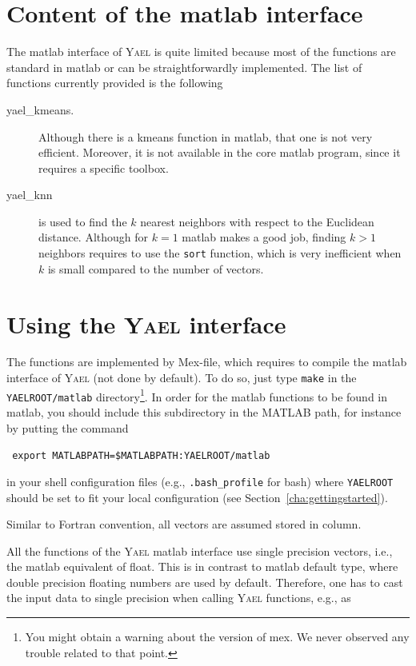 \documentclass[a4paper,11pt,notitlepage,final,twoside]{report}
\newcommand{\yael}{\textsc{Yael}\xspace}
\newcommand{\yroot}{\texttt{YAELROOT}\xspace}
\newcommand{\tc}[1]{\texttt{#1}}
\newcommand{\code}[1]{\smallskip 

\texttt{#1} 
 \medskip

}
\begin{document}
\section{Content of the matlab interface}

The matlab interface of \yael is quite limited because most 
of the functions are standard in matlab or can be straightforwardly 
implemented. 
The list of functions currently provided is the following
\begin{description}
\item  [yael\_kmeans.] Although there is a kmeans function in matlab, 
that one is not very efficient. Moreover, it is not available in 
the core matlab program, since it requires a specific toolbox. 
\item [yael\_knn] is used to find the $k$ nearest neighbors with respect 
to the Euclidean distance. Although for $k=1$ matlab makes a good job, 
finding $k>1$ neighbors requires to use the \tc{sort} 
function, which is very inefficient when $k$ is small compared to the number 
of vectors. 
\end{description}


\section{Using the \yael interface}

The functions are implemented by Mex-file, 
which requires to compile the matlab interface of \yael 
(not done by default). To do so, just type \tc{make}
in the \tc{\yroot/matlab} directory\footnote{You might 
obtain a warning about the version of mex. We never observed 
any trouble related to that point. }. 
In order for the matlab functions to be found in matlab, 
you should include this subdirectory in the MATLAB path, for 
instance by putting the command 

\code{
export MATLABPATH=\$MATLABPATH:\yroot/matlab
}

in your shell configuration files (e.g., \tc{.bash\_profile} for bash) 
where \yroot should be set to fit your local configuration 
(see Section~\ref{cha:gettingstarted}). 
\bigskip

Similar to Fortran convention, all vectors are assumed stored in column. 
\bigskip

All the functions of the \yael matlab interface use 
single precision vectors, i.e., the matlab 
equivalent of float. This is in contrast to matlab default type, 
where double precision floating numbers are used by default. 
Therefore, one has to cast the input data to single precision 
when calling \yael functions, e.g., as 
\end{document}
